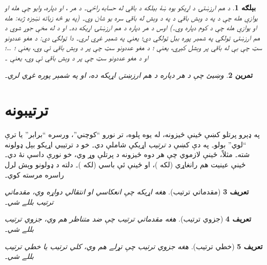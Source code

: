 \documentclass[12pt,a4paper,oneside]{report}
\newcommand{\Nat}{\mathbb{N}}
\newcommand{\Int}{\mathbb{Z}}
\newcommand{\PosInt}{\mathbb{Z}^{+}}
\newcommand{\equivrep}[2]{[#1]_{#2}}
\newcommand{\equivclass}[2]{#1/_{\!{#2}}}
\newcommand{\olfileid}[3]{\gdef\pspart{#1}\gdef\pschapter{#2}\gdef\pssection{#3}}
\newcommand{\olsection}[1]{\section{#1}\label{\pspart:\pschapter:\pssection:sec}}
\newcommand{\ollabel}[1]{\label{\pspart:\pschapter:\pssection:#1}}
\newenvironment{explain}{}{}
\newtheorem{defn}{تعريف}[section]
\newtheorem{ex}[defn]{بېلګه}
\newtheorem{prob}[defn]{تمرين}
\begin{document}
\begin{ex}
د هم ارزښتۍ د اړيکو يوه ښۀ بېلګه د باقي له حسابه راځي۔ د هر ،
 او \LR{$n \in \PosInt$} دپاره، وايو چې  هله او
يوازې هله چې د  په  د وېش باقي د  په  د وېش له باقي
سره يو شان وي۔ (په يو څه زياته نښيزه ژبه:  هله او
يوازې هله چې د کوم \LR{$k \in \Int$} دپاره  وي۔)
اوس د هر  دپاره  د هم ارزښتۍ اړيکه ده۔ او د
 له مخې جوړ شوي د هم ارزښتۍ ټولګي په شمېر پوره 
بېل ټولګي دي؛ يعنې \LR{$\equivclass{\Nat}{\equiv_n}$} په شمېر 
غړي لري۔ دا ټولګي دي: د هغو عددونو سټ چې بې له باقي پر
 وېشل کېږي، يعنې \LR{$\equivrep{0}{\equiv_n}$}؛ د هغو عددونو سټ
چې پر  د وېش باقي ئې  وي، يعنې \LR{$\equivrep{1}{\equiv_n}$}؛
\ldots؛ او د هغو عددونو سټ چې پر  د وېش باقي ئې  وي،
يعنې \LR{$\equivrep{n-1}{\equiv_n}$}۔
\end{ex}

\begin{prob}
وښيئ چې د هر \LR{$n \in \PosInt$} دپاره  د هم ارزښتۍ
اړيکه ده، او \LR{$\equivclass{\Nat}{\equiv_n}$} په شمېر پوره 
غړي لري۔
\end{prob}




\olfileid{sfr}{rel}{ord}
\olsection{ترتيبونه}

\begin{explain}
په ډېرو پرتلو کښې ځينې څيزونه، له يوه پلوه، تر نورو ``کوچني''،
ورسره ``برابر'' يا ترې ``لوي'' بولو۔ په دې کښې د \emph{ترتيب}
اړيکې شاملې دي۔ خو د ترتيبي اړيکو بېل ډولونه شته۔ مثلاً، ځينې
لازموي چې هر دوه څيزونه د پرتلې وړ وي، خو نورې داسې نۀ دي۔ ځينې
عينيت هم رانغاړي (لکه \LR{$\le$})، او ځينې ئې باسي (لکه \LR{$<$})۔ دلته د
ډولونو وېش لرل راسره مرسته کوي۔
\end{explain}

\begin{defn}[مقدماتي ترتيب]
هغه اړيکه چې انعکاسي او انتقالي دواړه وي، \emph{مقدماتي ترتيب}
بللے شي۔
\end{defn}

\begin{defn}[جزوي ترتيب]
هغه مقدماتي ترتيب چې ضد متناظر هم وي، \emph{جزوي ترتيب} بللے شي۔
\end{defn}

\begin{defn}[خطي ترتيب]\ollabel{def:linearorder}
هغه جزوي ترتيب چې تړلے هم وي، \emph{کلي ترتيب} يا \emph{خطي ترتيب}
بللے شي۔
\end{defn}
\end{document}
